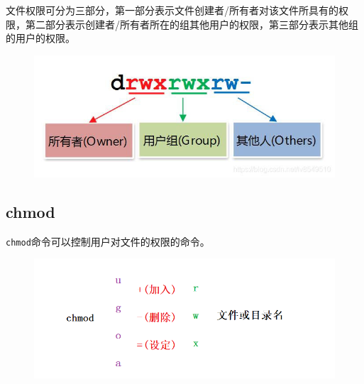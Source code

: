 \documentclass[12pt, openany, oneside]{book}
\begin{document}
文件权限可分为三部分，第一部分表示文件创建者/所有者对该文件所具有的权限，第二部分表示创建者/所有者所在的组其他用户的权限，第三部分表示其他组的用户的权限。 \\

\begin{table}[H]
	\centering
	\caption{文件权限}
\end{table}

\begin{figure}[H]
	\centering
	\includegraphics[scale=0.7]{img/C5/5-2/2.png}
\end{figure}

\subsection{chmod}

\lstinline|chmod|命令可以控制用户对文件的权限的命令。

\begin{figure}[H]
	\centering
	\includegraphics[scale=0.6]{img/C5/5-2/3.png}
\end{figure}
\end{document}
